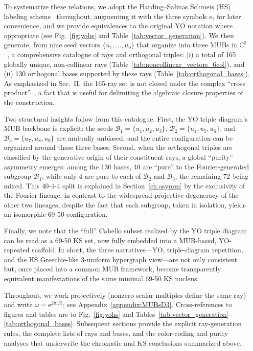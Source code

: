 \documentclass[%
  reprint,
  superscriptaddress,
  showpacs,
  showkeys,
  amsmath,amssymb,
  pra,
  longbibliography,
  floatfix,
  x11names
]{revtex4-2}
\newcommand{\ii}{\mathrm{i}}
\begin{document}
To systematize these relations, we adopt the Harding--Salinas Schmeis (HS) labeling scheme~\cite{harding2025remarksIJTP} throughout,
augmenting it with the three symbols $e_i$ for later convenience, and we provide equivalences to the original YO notation where appropriate
(see Fig.~\ref{fig:yohs} and Table~\ref{tab:vector_generation}).
We then generate, from nine seed vectors $\{u_1,\dots,u_9\}$ that organize into three MUBs in $\mathbb{C}^3$~\cite{durt,mcnulty2024mutually},
a comprehensive catalogue of rays and orthogonal triples:
(i) a total of 165 globally unique, non-collinear rays (Table~\ref{tab:noncollinear_vectors_6col}), and
(ii) 130 orthogonal bases supported by these rays (Table~\ref{tab:orthogonal_bases}).
As emphasized in Sec.~II, the 165-ray set is not closed under the complex ``cross product''~\cite{harding2025remarksIJTP}, a fact that is useful for delimiting the algebraic closure properties of the construction.

Two structural insights follow from this catalogue.
First, the YO triple diagram's MUB backbone is explicit:
the seeds $\mathcal{B}_1=\{u_1,u_2,u_3\}$, $\mathcal{B}_2=\{u_4,u_5,u_6\}$, and $\mathcal{B}_3=\{u_7,u_8,u_9\}$
are mutually unbiased, and the entire configuration can be organized around these three bases.
Second, when the orthogonal triples are classified by the generative origin of their constituent rays,
a global ``purity'' asymmetry emerges: among the 130 bases, 40 are ``pure'' to the Fourier-generated subgroup $\mathcal{B}_1$,
while only 4 are pure to each of $\mathcal{B}_2$ and $\mathcal{B}_3$, the remaining 72 being mixed.
This 40-4-4 split is explained in Section~\ref{ch:asymm} by the exclusivity of the Fourier lineage,
in contrast to the widespread projective degeneracy of the other two lineages, despite the fact that each subgroup, taken in isolation,
yields an isomorphic 69-50 configuration.

Finally, we note that the ``full'' Cabello subset realized by the YO triple diagram can be read as a 69-50 KS set, now fully embedded into a MUB-based, YO-repeated scaffold. In short, the three narratives---YO, triple-diagram repetition, and the HS Greechie-like 3-uniform hypergraph view---are not only consistent but, once placed into a common MUB framework, become transparently equivalent manifestations of the same minimal 69-50 KS nucleus.

Throughout, we work projectively (nonzero scalar multiples define the same ray) and write $\omega=\mathrm{e}^{2\pi \ii{}/3}$;
see Appendix~\ref{appendix:MUBsD3}. Cross-references to figures and tables are to Fig.~\ref{fig:yohs}
and Tables~\ref{tab:vector_generation}--\ref{tab:orthogonal_bases}.
Subsequent sections provide the explicit ray-generation rules, the complete lists of rays and bases,
and the color-coding and purity analyses that underwrite the chromatic and KS conclusions summarized above.
\end{document}
